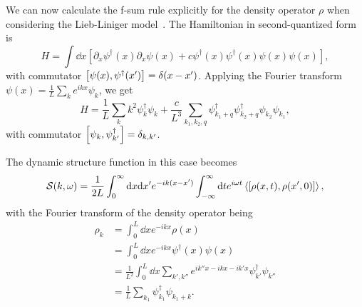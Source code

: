 \documentclass[11pt, a4paper]{report} %
\begin{document}
\begin{sloppypar}
We can now calculate the f-sum rule explicitly for the density operator \(\rho\) when considering the Lieb-Liniger model~\cite{Cauxfsum}.
The Hamiltonian in second-quantized form is~\cite{Franchini2017} 
\begin{equation}
  \label{eq:1}
  H = \int \dd x \left[\partial_x\psi^{\dag}(x) \partial_{x} \psi(x) + c \psi^{\dag}(x)\psi^{\dag}(x)\psi(x)\psi(x)\right],
\end{equation}
with commutator \(\qty[\psi(x), \psi^{\dagger}(x')] = \delta\qty(x-x')\).
Applying the Fourier transform \(\psi (x) = \frac{1}{L}\sum_{k} e^{ikx}\psi_k\), we get
\begin{equation}
  \label{eq:2}
  H = \frac{1}{L} \sum_k k^2 \psi^{\dagger}_{k}\psi_k +\frac{c}{L^3} \sum_{k_1,k_2,q} \psi^{\dag}_{k_1+q} \psi^{\dag}_{k_2+q} \psi_{k_2} \psi_{k_1},
\end{equation}
with commutator \(\qty[\psi_k,\psi_{k'}^{\dag}]=\delta_{k,k'}\).
\end{sloppypar}

The dynamic structure function in this case becomes
\begin{equation}
  \label{eq:3}
  \mathcal{S}(k,\omega) = \frac{1}{2L} \int_0^{\infty} \dd x \dd x' e^{-ik(x-x')} \int_{-\infty}^{\infty} \dd t e^{i\omega t} \expval{\left[\rho(x, t), \rho(x',0)\right]},
\end{equation}
with the Fourier transform of the density operator being 
\begin{align}
  \label{eq:4}
  \rho_k &= \int_{0}^{L} \dd x e^{-ikx} \rho(x) \\
         &= \int_{0}^{L} \dd x e^{-ikx} \psi^{\dag}(x) \psi(x)\\
         &= \frac{1}{L^2} \int_{0}^{L} \dd x \sum_{k',k''} e^{ik''x-ikx-ik'x} \psi_{k'}^{\dag} \psi_{k''}\\
         &= \frac{1}{L} \sum_{k_1} \psi_{k_1}^{\dag} \psi_{k_1+k}.
\end{align}
\end{document}
